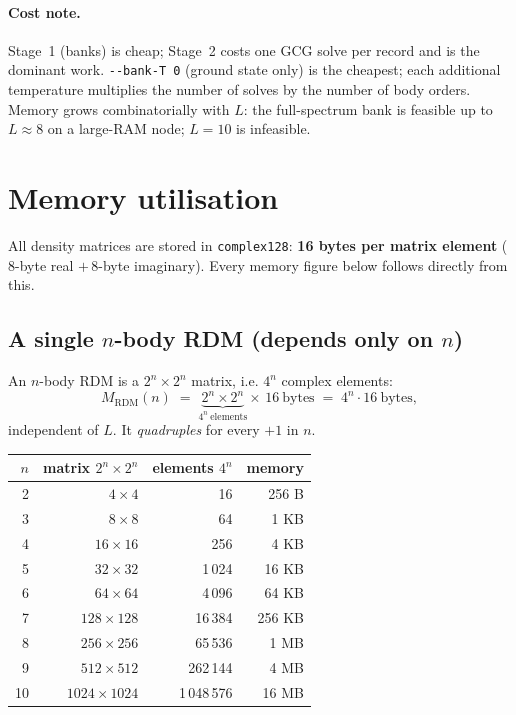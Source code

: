 \documentclass[11pt]{article}
\newcommand{\code}[1]{\texttt{\small #1}}
\begin{document}
\paragraph{Cost note.} Stage~1 (banks) is cheap; Stage~2 costs one GCG solve per
record and is the dominant work. \code{-{}-bank-T 0} (ground state only) is the
cheapest; each additional temperature multiplies the number of solves by the
number of body orders. Memory grows combinatorially with $L$: the full-spectrum
bank is feasible up to $L\approx8$ on a large-RAM node; $L=10$ is infeasible.

\section{Memory utilisation}\label{sec:memory}
All density matrices are stored in \code{complex128}: \textbf{16 bytes per
matrix element} ($8$-byte real $+\,8$-byte imaginary). Every memory figure below
follows directly from this.

\subsection{A single $n$-body RDM (depends only on $n$)}
An $n$-body RDM is a $2^{n}\times2^{n}$ matrix, i.e. $4^{n}$ complex elements:
\[
  M_{\mathrm{RDM}}(n) \;=\; \underbrace{2^{n}\times 2^{n}}_{4^{n}\ \text{elements}}
  \times\, 16\ \text{bytes} \;=\; 4^{n}\cdot 16\ \text{bytes},
\]
independent of $L$. It \emph{quadruples} for every $+1$ in $n$.
\begin{center}
\begin{tabular}{@{}rrrr@{}}
\toprule
$n$ & matrix $2^n\!\times\!2^n$ & elements $4^{n}$ & memory \\ \midrule
2  & $4\times4$        & 16          & 256 B  \\
3  & $8\times8$        & 64          & 1 KB   \\
4  & $16\times16$      & 256         & 4 KB   \\
5  & $32\times32$      & 1\,024      & 16 KB  \\
6  & $64\times64$      & 4\,096      & 64 KB  \\
7  & $128\times128$    & 16\,384     & 256 KB \\
8  & $256\times256$    & 65\,536     & 1 MB   \\
9  & $512\times512$    & 262\,144    & 4 MB   \\
10 & $1024\times1024$  & 1\,048\,576 & 16 MB  \\
\bottomrule
\end{tabular}
\end{center}
\end{document}
